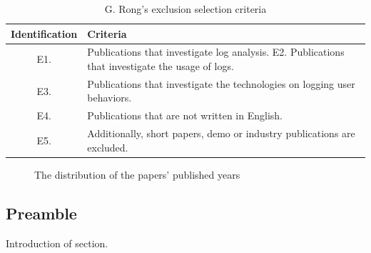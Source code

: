 \begin{table}[!htb]
    \centering
    \small
    \caption{G. Rong's exclusion selection criteria \cite{Rong2018a}}
    \label{tbl:CH1_RongExlSelectionCriteria}
    \begin{tabularx}{\textwidth}{|c|X|}
        \hline \textbf{Identification} & \textbf{Criteria} \\
        \hline E1.& Publications that investigate log analysis. E2. Publications that investigate the usage of logs. \\
        \hline E3. & Publications that investigate the technologies on logging user behaviors. \\
        \hline E4. & Publications that are not written in English. \\
        \hline  E5. & Additionally, short papers, demo or industry publications are excluded. \\
        \hline
    \end{tabularx}
\end{table}

\begin{figure}[!htb]
    \centering
    \caption{The distribution of the papers’ published years \cite{Rong2018a}} \label{fig:CH1_PushblisedPapers}
\end{figure}

\subsection{Preamble}
Introduction of section.

